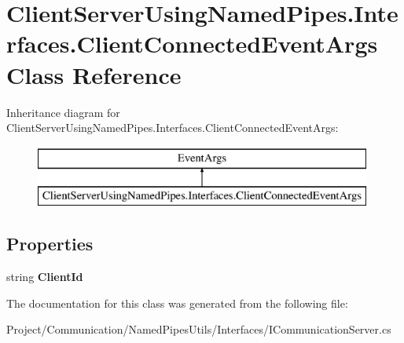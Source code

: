 \hypertarget{class_client_server_using_named_pipes_1_1_interfaces_1_1_client_connected_event_args}{}\section{Client\+Server\+Using\+Named\+Pipes.\+Interfaces.\+Client\+Connected\+Event\+Args Class Reference}
\label{class_client_server_using_named_pipes_1_1_interfaces_1_1_client_connected_event_args}
Inheritance diagram for Client\+Server\+Using\+Named\+Pipes.\+Interfaces.\+Client\+Connected\+Event\+Args\+:\begin{figure}[H]
\begin{center}
\leavevmode
\includegraphics[height=2.000000cm]{class_client_server_using_named_pipes_1_1_interfaces_1_1_client_connected_event_args}
\end{center}
\end{figure}
\subsection*{Properties}
\begin{DoxyCompactItemize}
\item 
\mbox{\label{class_client_server_using_named_pipes_1_1_interfaces_1_1_client_connected_event_args_a7b9634a42796e554e65e6de7256aa6ed}} 
string {\bfseries Client\+Id}
\end{DoxyCompactItemize}


The documentation for this class was generated from the following file\+:\begin{DoxyCompactItemize}
\item 
Project/\+Communication/\+Named\+Pipes\+Utils/\+Interfaces/I\+Communication\+Server.\+cs\end{DoxyCompactItemize}

